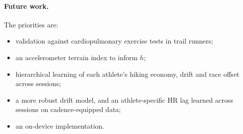 \documentclass[11pt,a4paper]{article}
\begin{document}
\paragraph{Future work.} The priorities are:
\begin{itemize}[leftmargin=*]
\item validation against cardiopulmonary exercise tests in trail runners;
\item an accelerometer terrain index to inform $h$;
\item hierarchical learning of each athlete's hiking economy, drift and race offset across sessions;
\item a more robust drift model, and an athlete-specific HR lag learned across sessions on cadence-equipped data;
\item an on-device implementation.
\end{itemize}

\end{document}
